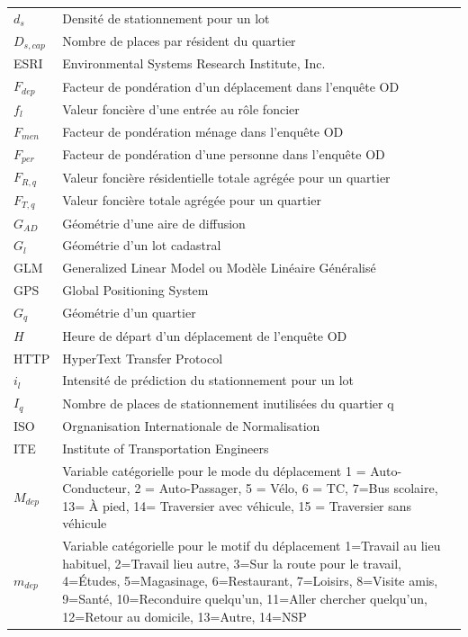 \begin{longtable}{lp{5in}}
$d_s$ & Densité de stationnement pour un lot\\
$D_{s,cap}$ & Nombre de places par résident du quartier \\
ESRI    & Environmental Systems Research Institute, Inc.                                \\
$F_{dep}$ & Facteur de pondération d'un déplacement dans l'enquête OD\\
$f_l$ & Valeur foncière d'une entrée au rôle foncier\\
$F_{men}$ & Facteur de pondération ménage dans l'enquête OD                             \\
$F_{per}$ & Facteur de pondération d'une personne dans l'enquête OD                     \\
$F_{R,q}$ & Valeur foncière résidentielle totale agrégée pour un quartier\\
$F_{T,q}$ & Valeur foncière totale agrégée pour un quartier\\
$G_{AD}$ & Géométrie d'une aire de diffusion\\
$G_l$ & Géométrie d'un lot cadastral \\
GLM     & Generalized Linear Model ou Modèle Linéaire Généralisé                        \\
GPS     & Global Positioning System                                                    \\
$G_q$ & Géométrie d'un quartier\\
$H$ & Heure de départ d'un déplacement de l'enquête OD \\ 
HTTP    & HyperText Transfer Protocol                                                   \\
$i_l$ & Intensité de prédiction du stationnement pour un lot \\
$I_q$ & Nombre de places de stationnement inutilisées du quartier q\\
ISO     & Orgnanisation Internationale de Normalisation                                 \\
ITE     & Institute of Transportation Engineers                                         \\
$M_{dep}$ & Variable catégorielle pour le mode du déplacement 1 = Auto-Conducteur, 2 = Auto-Passager, 5 = Vélo, 6 = TC, 7=Bus scolaire, 13= À pied, 14= Traversier avec véhicule, 15 = Traversier sans véhicule\\
$m_{dep}$ & Variable catégorielle pour le motif du déplacement 1=Travail au lieu habituel, 2=Travail lieu autre, 3=Sur la route pour le travail, 4=Études, 5=Magasinage, 6=Restaurant, 7=Loisirs, 8=Visite amis, 9=Santé, 10=Reconduire quelqu'un, 11=Aller chercher quelqu'un, 12=Retour au domicile, 13=Autre, 14=NSP \\

\end{longtable}
